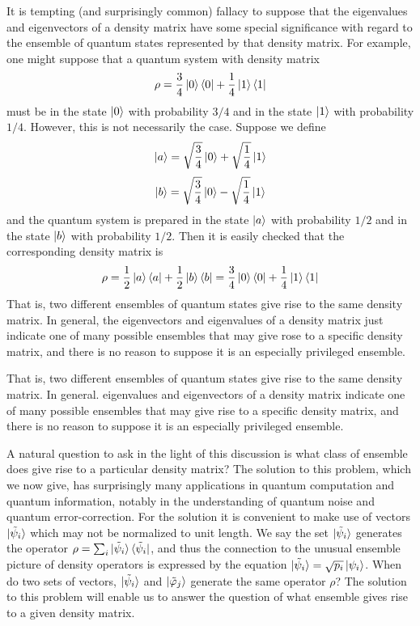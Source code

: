 \documentclass[12pt, oneside]{book}
\theoremstyle{definition}
\theoremstyle{definition}
\theoremstyle{remark}
\begin{document}
It is tempting (and surprisingly common) fallacy to suppose that the eigenvalues and eigenvectors of a density matrix have some special significance with regard to the ensemble of quantum states represented by that density matrix. For example, one might suppose that a quantum system with density matrix
\[
\rho=\frac{3}{4}\ket{0}\bra{0} +\frac{1}{4}\ket{1}\bra{1}
\]
must be in the state $\ket{0}$ with probability $3/4$ and in the state $\ket{1}$ with probability $1/4$. However, this is not necessarily the case. Suppose we define
\[
\ket{a}=\sqrt{\frac{3}{4}}\ket{0}+\sqrt{\frac{1}{4}}\ket{1}
\]
\[
\ket{b}=\sqrt{\frac{3}{4}}\ket{0}-\sqrt{\frac{1}{4}}\ket{1}
\]
and the quantum system is prepared in the state $\ket{a}$ with probability $1/2$ and in the state $\ket{b}$ with probability $1/2$. Then it is easily checked that the corresponding density matrix is 
\[
\rho=\frac{1}{2}\ket{a}\bra{a}+\frac{1}{2}\ket{b}\bra{b}=\frac{3}{4}\ket{0}\bra{0}+\frac{1}{4}\ket{1}\bra{1}
\]
That is, two different ensembles of quantum states give rise to the same density matrix. In general, the eigenvectors and eigenvalues of a density matrix just indicate one of many possible ensembles that may give rose to a specific density matrix, and there is no reason to suppose it is an especially privileged ensemble.

That is, two different ensembles of quantum states give rise to the same density matrix. In general. eigenvalues and eigenvectors of a density matrix indicate one of many possible ensembles that may give rise to a specific density matrix, and there is no reason to suppose it is an especially privileged ensemble.

A natural question to ask in the light of this discussion is what class of ensemble does give rise to a particular density matrix? The solution to this problem, which we now give, has surprisingly many applications in quantum computation and quantum information, notably in the understanding of quantum noise and quantum error-correction. For the solution it is convenient to make use of vectors $\ket{\tilde{\psi}_i}$ which may not be normalized to unit length. We say the set $\ket{\tilde{\psi}_i}$ generates the operator $\rho=\sum_i\ket{\tilde{\psi}_i}\bra{\tilde{\psi}_i}$, and thus the connection to the unusual ensemble picture of density operators is expressed by the equation $\ket{\tilde{\psi}_i}=\sqrt{p_i}\ket{\psi_i}$. When do two sets of vectors, $\ket{\tilde{\psi}_i}$ and $\ket{\tilde{\varphi}_j}$ generate the same operator $\rho$? The solution to this problem will enable us to answer the question of what ensemble gives rise to a given density matrix.
\end{document}
